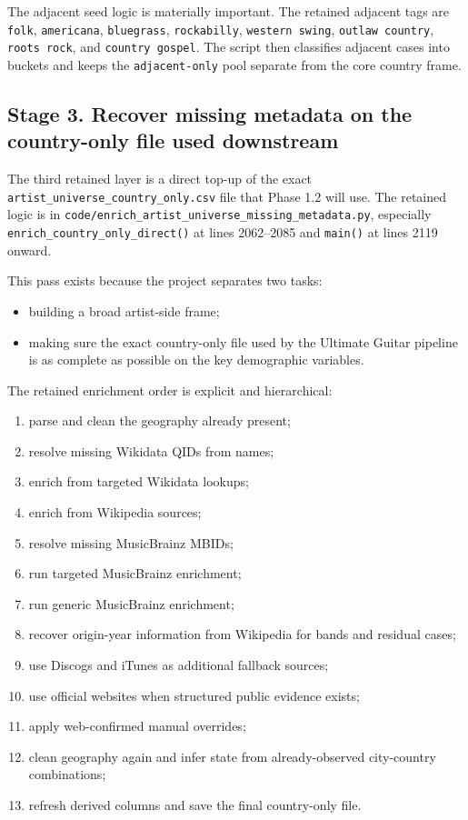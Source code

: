 \documentclass[11pt]{article}
\begin{document}
The adjacent seed logic is materially important. The retained adjacent tags are
\texttt{folk}, \texttt{americana}, \texttt{bluegrass},
\texttt{rockabilly}, \texttt{western swing}, \texttt{outlaw country},
\texttt{roots rock}, and \texttt{country gospel}. The script then classifies
adjacent cases into buckets and keeps the \texttt{adjacent-only} pool separate
from the core country frame.

\subsection{Stage 3. Recover missing metadata on the country-only file used downstream}
The third retained layer is a direct top-up of the exact
\texttt{artist\_universe\_country\_only.csv} file that Phase 1.2 will use. The
retained logic is in
\texttt{code/enrich\_artist\_universe\_missing\_metadata.py}, especially
\texttt{enrich\_country\_only\_direct()} at lines 2062--2085 and
\texttt{main()} at lines 2119 onward.

This pass exists because the project separates two tasks:
\begin{itemize}[leftmargin=2em]
\item building a broad artist-side frame;
\item making sure the exact country-only file used by the Ultimate Guitar
pipeline is as complete as possible on the key demographic variables.
\end{itemize}

The retained enrichment order is explicit and hierarchical:
\begin{enumerate}[leftmargin=2em]
\item parse and clean the geography already present;
\item resolve missing Wikidata QIDs from names;
\item enrich from targeted Wikidata lookups;
\item enrich from Wikipedia sources;
\item resolve missing MusicBrainz MBIDs;
\item run targeted MusicBrainz enrichment;
\item run generic MusicBrainz enrichment;
\item recover origin-year information from Wikipedia for bands and residual
cases;
\item use Discogs and iTunes as additional fallback sources;
\item use official websites when structured public evidence exists;
\item apply web-confirmed manual overrides;
\item clean geography again and infer state from already-observed
city-country combinations;
\item refresh derived columns and save the final country-only file.
\end{enumerate}
\end{document}
